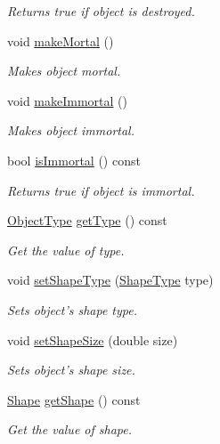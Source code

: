\begin{DoxyCompactItemize}
\begin{DoxyCompactList}\small\item\em Returns true if object is destroyed. \end{DoxyCompactList}\item 
void \hyperlink{classObject_ab810f6d0305506bb0803afcde852c1c8}{make\-Mortal} ()
\begin{DoxyCompactList}\small\item\em Makes object mortal. \end{DoxyCompactList}\item 
void \hyperlink{classObject_ad73c94472b9a43a629ae4cd6d2def67e}{make\-Immortal} ()
\begin{DoxyCompactList}\small\item\em Makes object immortal. \end{DoxyCompactList}\item 
bool \hyperlink{classObject_a7a38ff74620fa8c16a21e46149027e6a}{is\-Immortal} () const 
\begin{DoxyCompactList}\small\item\em Returns true if object is immortal. \end{DoxyCompactList}\item 
\hyperlink{BasicTypes_8h_a842c5e2e69277690b064bf363c017980}{Object\-Type} \hyperlink{classObject_a7660dc25529325326bc280e5f5fb0194}{get\-Type} () const 
\begin{DoxyCompactList}\small\item\em Get the value of type. \end{DoxyCompactList}\item 
void \hyperlink{classObject_a81450ac8abbba5ee97e2558cffabedf5}{set\-Shape\-Type} (\hyperlink{BasicTypes_8h_a5a4538eeab397888d88a4eefcc5a1345}{Shape\-Type} type)
\begin{DoxyCompactList}\small\item\em Sets object's shape type. \end{DoxyCompactList}\item 
void \hyperlink{classObject_af4a10aeb0de43db0d6bc43d6b6d9280b}{set\-Shape\-Size} (double size)
\begin{DoxyCompactList}\small\item\em Sets object's shape size. \end{DoxyCompactList}\item 
\hyperlink{classShape}{Shape} \hyperlink{classObject_ab55fd6193bbe9f7f4deb793222e79ca7}{get\-Shape} () const 
\begin{DoxyCompactList}\small\item\em Get the value of shape. \end{DoxyCompactList}\item 

\end{DoxyCompactItemize}

